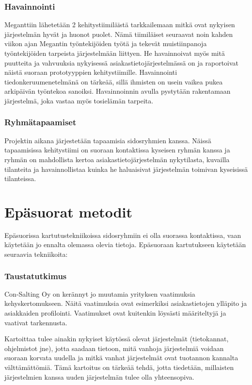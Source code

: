         \subsubsection*{Havainnointi}

            Meganttiin lähetetään 2 kehitystiimiläistä tarkkailemaan mitkä ovat nykyisen järjestelmän hyvät ja huonot puolet. Nämä tiimiläiset seuraavat noin kahden viikon ajan Megantin työntekijöiden työtä ja tekevät 
            muistiinpanoja työntekijöiden tarpeista järjestelmään liittyen. He havainnoivat myös mitä puutteita ja vahvuuksia nykyisessä asiakastietojärjestelmässä on ja raportoivat näistä suoraan prototyyppien kehitystiimille. Havainnointi tiedonkeruumenetelmänä on tärkeää, sillä ihmisten on usein vaikea pukea arkipäivän työntekoa sanoiksi. Havainnoinnin avulla pystytään rakentamaan järjestelmä, joka vastaa myös tosielämän tarpeita.


        \subsubsection*{Ryhmätapaamiset}

            Projektin aikana järjestetään tapaamisia sidosryhmien kanssa. Näissä tapaamisissa kehitystiimi on suoraan kontaktissa kyseisen ryhmän kanssa ja ryhmän on mahdollista kertoa asiakastietojärjestelmän nykytilasta, kuvailla tilanteita ja havainnollistaa kuinka he haluaisivat järjestelmän toimivan kyseisissä tilanteissa.


    \section*{Epäsuorat metodit}

        Epäsuorissa kartutustekniikoissa sidosryhmiin ei olla suorassa kontaktissa, vaan käytetään jo ennalta olemassa olevia tietoja.
        Epäsuoraan kartutukseen käytetään seuraavia tekniikoita:

        \subsubsection*{Taustatutkimus}

        Con-Salting Oy on kerännyt jo muutamia yrityksen vaatimuksia kehyskertomukseen. 
        Näitä vaatimuksia ovat esimerkiksi asiakastietojen ylläpito ja asiakkaiden profilointi.
        Vaatimukset ovat kuitenkin löysästi määriteltyjä ja vaativat tarkennusta.

	Kartoittaa tulee ainakin nykyiset käytössä olevat järjestelmät (tietokannat, ohjelmistot jne), jotta saadaan tietoon, mitä vanhoja järjestelmiä voidaan suoraan korvata uudella ja mitkä vanhat järjestelmät ovat tuotannon kannalta välttämättömiä. Tämä kartoitus on tärkeää tehdä, jotta tiedetään, millaisten järjestelmien kanssa uuden järjestelmän tulee olla yhteensopiva.

